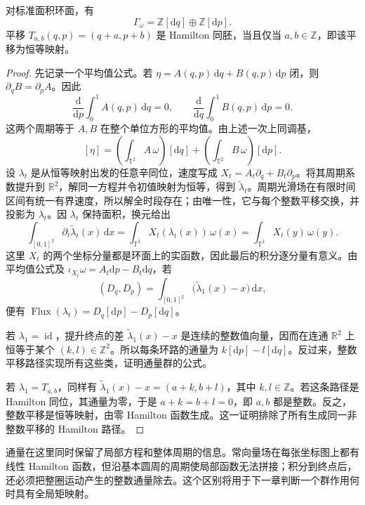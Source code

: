 \begin{proposition}\label{g4:prop:0903:torus-flux-lattice}
	对标准面积环面，有
	\[
		\Gamma_\omega=\mathbb Z[\mathrm{d}q]\oplus\mathbb Z[\mathrm{d}p].
	\]
	平移 \(T_{a,b}(q,p)=(q+a,p+b)\) 是 Hamilton 同胚，当且仅当 \(a,b\in\mathbb Z\)，即该平移为恒等映射。
\end{proposition}
\begin{proof}
	先记录一个平均值公式。若 \(\eta=A(q,p)\,\mathrm{d}q+B(q,p)\,\mathrm{d}p\) 闭，则 \(\partial_qB=\partial_pA\)。因此
	\[
		\frac{\mathrm{d}}{\mathrm{d}p}\int_0^1A(q,p)\,\mathrm{d}q=0,
		\qquad
		\frac{\mathrm{d}}{\mathrm{d}q}\int_0^1B(q,p)\,\mathrm{d}p=0.
	\]
	这两个周期等于 \(A,B\) 在整个单位方形的平均值。由上述一次上同调基，
	\[
		[\eta]=\left(\int_{\mathbb T^2}A\,\omega\right)[\mathrm{d}q]
		+\left(\int_{\mathbb T^2}B\,\omega\right)[\mathrm{d}p].
	\]
	设 \(\lambda_t\) 是从恒等映射出发的任意辛同位，速度写成 \(X_t=A_t\partial_q+B_t\partial_p\)。将其周期系数提升到 \(\mathbb R^2\)，解同一方程并令初值映射为恒等，得到 \(\widetilde\lambda_t\)。周期光滑场在有限时间区间有统一有界速度，所以解全时段存在；由唯一性，它与每个整数平移交换，并投影为 \(\lambda_t\)。因 \(\lambda_t\) 保持面积，换元给出
	\[
		\int_{[0,1]^2}\partial_t\widetilde\lambda_t(x)\,\mathrm{d}x
		=\int_{\mathbb T^2}X_t(\lambda_t(x))\,\omega(x)
		=\int_{\mathbb T^2}X_t(y)\,\omega(y).
	\]
	这里 \(X_t\) 的两个坐标分量都是环面上的实函数，因此最后的积分逐分量有意义。由平均值公式及 \(\iota_{X_t}\omega=A_t\mathrm{d}p-B_t\mathrm{d}q\)，若
	\[
		(D_q,D_p)=\int_{[0,1]^2}\bigl(\widetilde\lambda_1(x)-x\bigr)\,\mathrm{d}x,
	\]
	便有 \(\operatorname{Flux}(\lambda_t)=D_q[\mathrm{d}p]-D_p[\mathrm{d}q]\)。

	若 \(\lambda_1=\operatorname{id}\)，提升终点的差 \(\widetilde\lambda_1(x)-x\) 是连续的整数值向量，因而在连通 \(\mathbb R^2\) 上恒等于某个 \((k,l)\in\mathbb Z^2\)。所以每条环路的通量为 \(k[\mathrm{d}p]-l[\mathrm{d}q]\)。反过来，整数平移路径实现所有这些类，证明通量群的公式。

	若 \(\lambda_1=T_{a,b}\)，同样有 \(\widetilde\lambda_1(x)-x=(a+k,b+l)\)，其中 \(k,l\in\mathbb Z\)。若这条路径是 Hamilton 同位，其通量为零，于是 \(a+k=b+l=0\)，即 \(a,b\) 都是整数。反之，整数平移是恒等映射，由零 Hamilton 函数生成。这一证明排除了所有生成同一非整数平移的 Hamilton 路径。
\end{proof}

通量在这里同时保留了局部方程和整体周期的信息。常向量场在每张坐标图上都有线性 Hamilton 函数，但沿基本圆周的周期使局部函数无法拼接；积分到终点后，还必须把整圈运动产生的整数通量除去。这个区别将用于下一章判断一个群作用何时具有全局矩映射。
